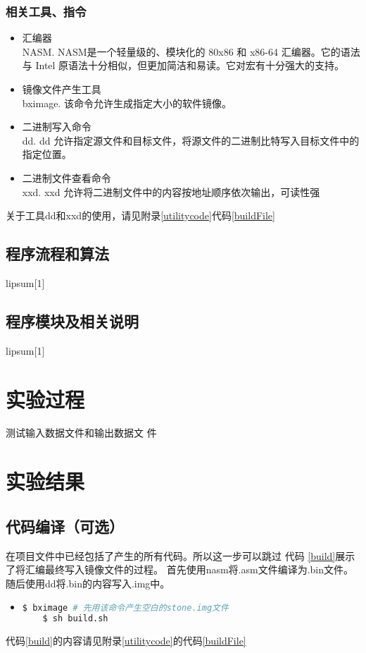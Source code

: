 \documentclass[a4paper]{article}
\begin{document}
\subsubsection{相关工具、指令}
\begin{itemize}
    \item 汇编器\\ 
    NASM. NASM是一个轻量级的、模块化的 80x86 和 x86-64 汇编器。它的语法与
    Intel 原语法十分相似，但更加简洁和易读。它对宏有十分强大的支持。
    \item 镜像文件产生工具\\ 
    bximage. 该命令允许生成指定大小的软件镜像。
    \item 二进制写入命令\\ 
    dd. dd 允许指定源文件和目标文件，将源文件的二进制比特写入目标文件中的指定位置。
    \item 二进制文件查看命令\\ 
    xxd. xxd 允许将二进制文件中的内容按地址顺序依次输出，可读性强
\end{itemize}
关于工具dd和xxd的使用，请见附录\ref{utilitycode}代码\ref{buildFile}
\subsection{程序流程和算法}

lipsum[1]
\subsection{程序模块及相关说明}
lipsum[1]
\section{实验过程}
测试输入数据文件和输出数据文
件
\section{实验结果} 
    \subsection{代码编译（可选）}
    在项目文件中已经包括了产生的所有代码。所以这一步可以跳过
    代码 \ref{build}展示了将汇编最终写入镜像文件的过程。
    首先使用nasm将.asm文件编译为.bin文件。随后使用dd将.bin的内容写入.img中。

    \begin{itemize}
    \item[] \begin{lstlisting}[language=sh, label=build, caption=将汇编转化为二进制并写入镜像]
    $ bximage # 先用该命令产生空白的stone.img文件
    $ sh build.sh
    \end{lstlisting}
    \end{itemize}
    代码\ref{build}的内容请见附录\ref{utilitycode}的代码\ref{buildFile}
\end{document}
